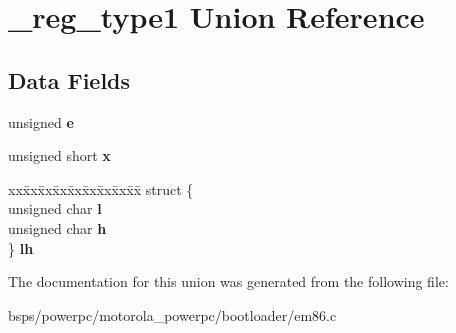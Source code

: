 \hypertarget{union__reg__type1}{}\section{\+\_\+reg\+\_\+type1 Union Reference}
\label{union__reg__type1}
\subsection*{Data Fields}
\begin{DoxyCompactItemize}
\item 
\mbox{\label{union__reg__type1_a2e4dca8919ffdd5789dd2ef29995762e}} 
unsigned {\bfseries e}
\item 
\mbox{\label{union__reg__type1_aa63655959409d84d50deb6ab061f1e81}} 
unsigned short {\bfseries x}
\item 
\mbox{\label{union__reg__type1_af5a09aaf4a00e73d353541b49fd1a386}} 
\begin{tabbing}
xx\=xx\=xx\=xx\=xx\=xx\=xx\=xx\=xx\=\kill
struct \{\\
\>unsigned char {\bfseries l}\\
\>unsigned char {\bfseries h}\\
\} {\bfseries lh}\\

\end{tabbing}\end{DoxyCompactItemize}


The documentation for this union was generated from the following file\+:\begin{DoxyCompactItemize}
\item 
bsps/powerpc/motorola\+\_\+powerpc/bootloader/em86.\+c\end{DoxyCompactItemize}
